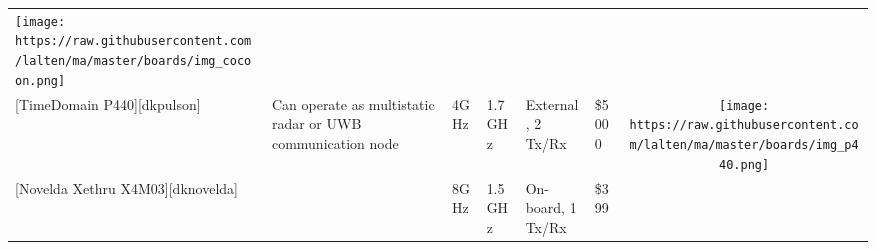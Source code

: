 \begin{longtable}[]{@{}llllllc@{}}
\begin{minipage}[t]{0.10\columnwidth}
\texttt{[image: https://raw.githubusercontent.com/lalten/ma/master/boards/img\_cocoon.png]}\strut
\end{minipage}\tabularnewline
\begin{minipage}[t]{0.09\columnwidth}\raggedright\strut
{[}TimeDomain P440{]}{[}dkpulson{]}\strut
\end{minipage} & \begin{minipage}[t]{0.13\columnwidth}\raggedright\strut
Can operate as multistatic radar or UWB communication node\strut
\end{minipage} & \begin{minipage}[t]{0.09\columnwidth}\raggedright\strut
4GHz\strut
\end{minipage} & \begin{minipage}[t]{0.11\columnwidth}\raggedright\strut
1.7GHz\strut
\end{minipage} & \begin{minipage}[t]{0.10\columnwidth}\raggedright\strut
External, 2 Tx/Rx\strut
\end{minipage} & \begin{minipage}[t]{0.15\columnwidth}\raggedright\strut
\$5000\strut
\end{minipage} & \begin{minipage}[t]{0.10\columnwidth}\centering\strut
\texttt{[image: https://raw.githubusercontent.com/lalten/ma/master/boards/img\_p440.png]}\strut
\end{minipage}\tabularnewline
\begin{minipage}[t]{0.09\columnwidth}\raggedright\strut
{[}Novelda Xethru X4M03{]}{[}dknovelda{]}\strut
\end{minipage} & \begin{minipage}[t]{0.13\columnwidth}\raggedright\strut
\strut
\end{minipage} & \begin{minipage}[t]{0.09\columnwidth}\raggedright\strut
8GHz\strut
\end{minipage} & \begin{minipage}[t]{0.11\columnwidth}\raggedright\strut
1.5GHz\strut
\end{minipage} & \begin{minipage}[t]{0.10\columnwidth}\raggedright\strut
On-board, 1 Tx/Rx\strut
\end{minipage} & \begin{minipage}[t]{0.15\columnwidth}\raggedright\strut
\$399\strut
\end{minipage} & \begin{minipage}[t]{0.10\columnwidth}\centering\strut

\end{minipage}
\end{longtable}
